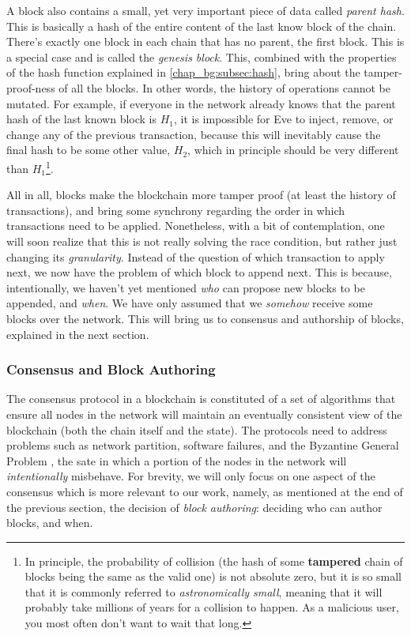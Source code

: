 A block also contains a small, yet very important piece of data called \textit{parent hash}. This is
basically a hash of the entire content of the last know block of the chain. There's exactly one
block in each chain that has no parent, the first block. This is a special case and is called the
\textit{genesis block}. This, combined with the properties of the hash function explained in
\ref{chap_bg:subsec:hash}, bring about the tamper-proof-ness of all the blocks. In other words, the
history of operations cannot be mutated. For example, if everyone in the network already knows that
the parent hash of the last known block is $H_1$, it is impossible for Eve to inject, remove, or
change any of the previous transaction, because this will inevitably cause the final hash to be some
other value, $H_2$, which in principle should be very different than $H_1$\footnote{In principle,
the probability of collision (the hash of some \textbf{tampered} chain of blocks being the same as
the valid one) is not absolute zero, but it is so small that it is commonly referred to
\textit{astronomically small}, meaning that it will probably take millions of years for a collision
to happen. As a malicious user, you most often don't want to wait that long.}.

All in all, blocks make the blockchain more tamper proof (at least the history of transactions), and
bring some synchrony regarding the order in which transactions need to be applied. Nonetheless, with
a bit of contemplation, one will soon realize that this is not really solving the race condition,
but rather just changing its \textit{granularity}. Instead of the question of which transaction to
apply next, we now have the problem of which block to append next. This is because, intentionally,
we haven't yet mentioned \textit{who} can propose new blocks to be appended, and \textit{when}. We
have only assumed that we \textit{somehow} receive some blocks over the network. This will bring us
to consensus and authorship of blocks, explained in the next section.


\subsubsection{Consensus and Block Authoring} \label{chap_bg:subsec:consensus_authorship}

The consensus protocol in a blockchain is constituted of a set of algorithms that ensure all nodes
in the network will maintain an eventually consistent view of the blockchain (both the chain itself
and the state). The protocols need to address problems such as network partition, software failures,
and the Byzantine General Problem \cite{Lamport_Shostak_Pease_1982}, the sate in which a portion of
the nodes in the network will \textit{intentionally} misbehave. For brevity, we will only focus on
one aspect of the consensus which is more relevant to our work, namely, as mentioned at the end of
the previous section, the decision of \textit{block authoring}: deciding who can author blocks, and
when.

